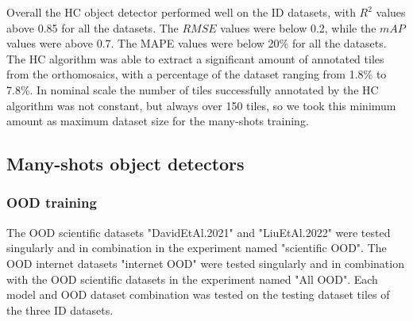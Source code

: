 \documentclass[12pt,a4paper,oneside]{report}
\begin{document}
Overall the HC object detector performed well on the ID datasets, with $R^2$ values
above 0.85 for all the datasets. The $RMSE$ values were below 0.2, while the $mAP$ values
were above 0.7. The MAPE values were below 20\% for all the datasets.
The HC algorithm was able to extract a significant amount of annotated tiles from the orthomosaics,
with a percentage of the dataset ranging from 1.8\% to 7.8\%.
In nominal scale the number of tiles successfully annotated by the HC algorithm was
not constant, but always over 150 tiles, so we took this minimum amount as 
maximum dataset size for the many-shots training.

\subsection{Many-shots object detectors}

\subsubsection{OOD training}

The OOD scientific datasets "DavidEtAl.2021" and "LiuEtAl.2022" were tested singularly 
and in combination in the experiment named "scientific OOD". The OOD internet datasets "internet OOD"
were tested singularly and in combination with the OOD scientific datasets in the experiment named "All OOD".
Each model and OOD dataset combination was tested on the testing dataset tiles of the three ID datasets.
\end{document}
